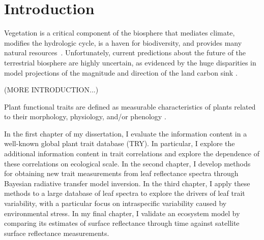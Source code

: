 \chapter{Introduction}
\label{chapter:Introduction}
\thispagestyle{myheadings}

Vegetation is a critical component of the biosphere that mediates climate, modifies the hydrologic cycle, is a haven for biodiversity, and provides many natural resources~\cite{bonan_forests_2008}.
Unfortunately, current predictions about the future of the terrestrial biosphere are highly uncertain, as evidenced by the huge disparities in model projections of the magnitude and direction of the land carbon sink \cite{friedlingstein_uncertainties_2014}.

(MORE INTRODUCTION...)

Plant functional traits are defined as measurable characteristics of plants related to their morphology, physiology, and/or phenology \cite{violle_2007_concept}.

In the first chapter of my dissertation, I evaluate the information content in a well-known global plant trait database (TRY).
In particular, I explore the additional information content in trait correlations and explore the dependence of these correlations on ecological scale.
In the second chapter, I develop methods for obtaining new trait measurements from leaf reflectance spectra through Bayesian radiative transfer model inversion.
In the third chapter, I apply these methods to a large database of leaf spectra to explore the drivers of leaf trait variability, with a particular focus on intraspecific variability caused by environmental stress.
In my final chapter, I validate an ecosystem model by comparing its estimates of surface reflectance through time against satellite surface reflectance measurements.
